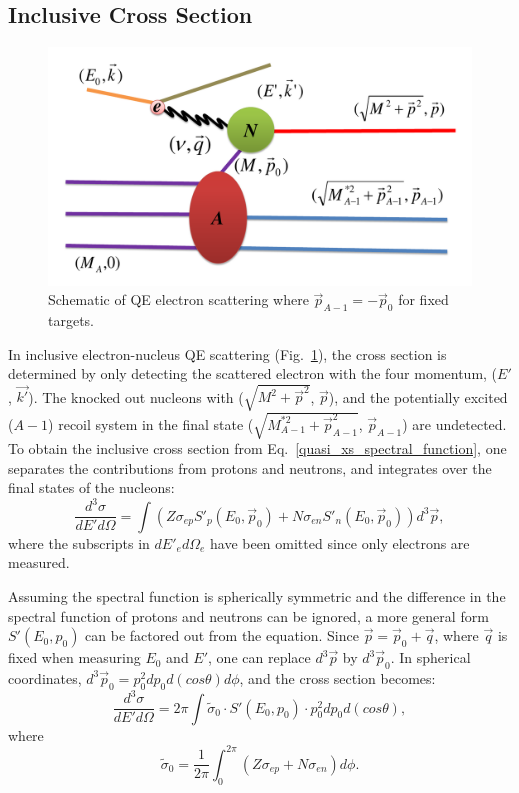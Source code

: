 \subsection{Inclusive Cross Section}
\begin{figure}[!ht]
  \begin{center}
    \includegraphics[type=pdf,ext=.pdf,read=.pdf,width=0.60\linewidth]{./figures/physics/includ_diagram}
    \caption[Schematic of QE electron scattering]{\footnotesize{Schematic of QE electron scattering where $\vec{p}_{A-1} = -\vec{p}_{0}$ for fixed targets.}}
    \label{qe_scatt_diag}
  \end{center}
\end{figure}
 In inclusive electron-nucleus QE scattering (Fig.~\ref{qe_scatt_diag}), the cross section is determined by only detecting the scattered electron with the four momentum, ($E'$, $\vec{k'}$). The knocked out nucleons with ($\sqrt{M^{2}+ \vec{p}^{2}}$, $\vec{p}$), and the potentially excited ($A-1$) recoil system in the final state ($\sqrt{M_{A-1}^{*2}+ \vec{p}_{A-1}^{2}}$, $\vec{p}_{A-1}$) are undetected. To obtain the inclusive cross section from Eq.~\eqref{quasi_xs_spectral_function}, one separates the contributions from protons and neutrons, and integrates over the final states of the nucleons:
\begin{equation}
  \frac{d^{3}\sigma}{dE'd\Omega} = \int (Z\sigma_{ep}S'_{p}(E_{0},\vec{p}_{0})+N\sigma_{en}S'_{n}(E_{0},\vec{p}_{0})) d^{3}\vec{p},
\end{equation}
where the subscripts in $dE'_{e}d\Omega_{e}$ have been omitted since only electrons are measured.

Assuming the spectral function is spherically symmetric and the difference in the spectral function of protons and neutrons can be ignored, a more general form $S'(E_{0},p_{0})$ can be factored out from the equation. Since $\vec{p} = \vec{p}_{0}+\vec{q}$, where $\vec{q}$ is fixed when measuring $E_{0}$ and $E'$, one can replace $d^{3}\vec{p}$ by $d^{3}\vec{p}_{0}$. In spherical coordinates, $d^{3}\vec{p}_{0}=p_{0}^{2} dp_{0}d(cos\theta) d\phi$, and the cross section becomes:
\begin{equation}
  \frac{d^{3}\sigma}{dE'd\Omega} = 2\pi \int \tilde{\sigma}_{0}\cdot S'(E_{0},p_{0})\cdot p_{0}^{2}dp_{0}d(cos\theta),
  \label{in_xs_org}
\end{equation}
where
\begin{equation}
  \tilde{\sigma}_{0} = \frac{1}{2\pi}\int_{0}^{2\pi} \left( Z\sigma_{ep}+N\sigma_{en} \right)d\phi.
\end{equation}


